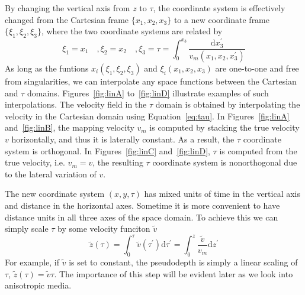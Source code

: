 By changing the vertical axis from $z$ to $\tau$, the coordinate system is effectively changed from the Cartesian frame $\lbrace x_1,x_2,x_3\rbrace$ to a new coordinate frame $\lbrace\xi_1,\xi_2,\xi_3\rbrace$, where the two coordinate systems are related by
\begin{equation}
\label{eq:xi}
\xi_1 = x_1 \quad, \xi_2 = x_2 \quad, \xi_3 = \tau = \int_0^{x_3} \frac{\mathrm{d} x_3^\prime}{v_m(x_1,x_2,x_3^\prime)}
\end{equation}
As long as the funtions $x_i(\xi_1,\xi_2,\xi_3)$ and $\xi_i(x_1,x_2,x_3)$ are one-to-one and free from singularities, we can interpolate any space functions between the Cartesian and $\tau$ domains.
Figures~\ref{fig:linA} to~\ref{fig:linD} illustrate examples of such interpolations. The velocity field in the $\tau$ domain is obtained by interpolating the velocity in the Cartesian domain using Equation~\ref{eq:tau}. In Figures~\ref{fig:linA} and~\ref{fig:linB}, the mapping velocity $v_m$ is computed by stacking the true velocity $v$ horizontally, and thus it is laterally constant. As a result, the $\tau$ coordinate system is orthogonal. In Figures~\ref{fig:linC} and~\ref{fig:linD}, $\tau$ is computed from the true velocity, i.e. $v_m=v$, the resulting $\tau$ coordinate system is nonorthogonal due to the lateral variation of $v$.


The new coordinate system $(x,y,\tau)$ has mixed units of time in the vertical axis and distance in the horizontal axes.
Sometime it is more convenient to have distance units in all three axes of the space domain. To achieve this we can simply scale $\tau$ by some velocity funciton $\tilde{v}$
\begin{equation}
  \tilde{z}(\tau) = \int_0^\tau \tilde{v}(\tau^\prime) \mathrm{d} \tau^\prime = \int_0^z \frac{\tilde{v}}{v_m} \mathrm{d} z^\prime
\end{equation}
For example, if $\tilde{v}$ is set to constant, the pseudodepth is simply a linear scaling of $\tau$, $\tilde{z}(\tau) = \tilde{v} \tau$.
The importance of this step will be evident later as we look into anisotropic media.

